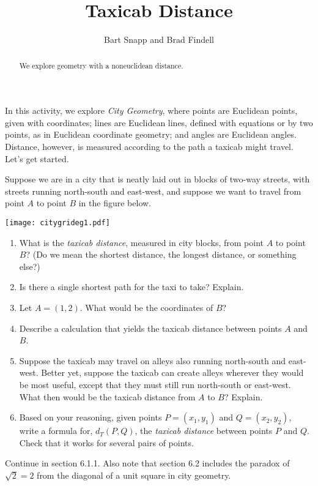 \documentclass[nooutcomes]{ximera}
\title{Taxicab Distance}
\author{Bart Snapp and Brad Findell}
\begin{document}
\begin{abstract}
  We explore geometry with a noneuclidean distance.
\end{abstract}
\maketitle

In this activity, we explore \emph{City Geometry}, where points are Euclidean points, given with coordinates; lines are Euclidean lines, defined with equations or by two points, as in Euclidean coordinate geometry; and angles are Euclidean angles.  Distance, however, is measured according to the path a taxicab might travel.  Let's get started.  
\begin{problem}
Suppose we are in a city that is neatly laid out in blocks of two-way streets, with streets running north-south and east-west, and suppose we want to travel from point $A$ to point $B$ in the figure below.  
\begin{image}
\texttt{[image: citygrideg1.pdf]}
\end{image}
\begin{enumerate}
\item What is the \emph{taxicab distance}, measured in city blocks, from point $A$ to point $B$?  (Do we mean the shortest distance, the longest distance, or something else?)  
\vspace{0.5in}
\item Is there a single shortest path for the taxi to take?  Explain.  
\vspace{0.5in}
\item Let $A = (1,2)$. What would be the coordinates of $B$?  
\vspace{0.5in}
\item Describe a calculation that yields the taxicab distance between points $A$ and $B$.  
\vspace{0.5in}
\item Suppose the taxicab may travel on alleys also running north-south and east-west.  Better yet, suppose the taxicab can create alleys wherever they would be most useful, except that they must still run north-south or east-west.  What then would be the taxicab distance from $A$ to $B$?  Explain.  
\vspace{0.5in}
\item Based on your reasoning, given points $P = (x_1, y_1)$ and $Q= (x_2, y_2)$, write a formula for, $d_T(P,Q)$, the \emph{taxicab distance} between points $P$ and $Q$.  Check that it works for several pairs of points.  
\end{enumerate}
\vfill
\end{problem}

\begin{teachingnote}
Continue in section 6.1.1. Also note that section 6.2 includes the paradox of $\sqrt{2}=2$ from the diagonal of a unit square in city geometry.
\end{teachingnote}
  
\end{document}
